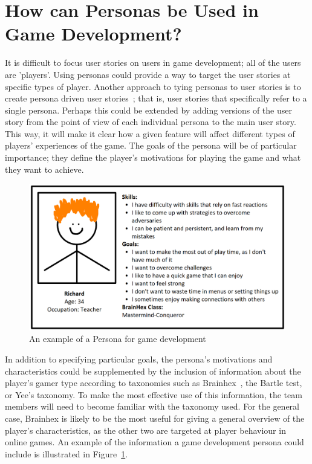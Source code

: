\documentclass{scrartcl}
\begin{document}
\section{How can Personas be Used in Game Development?}
It is difficult to focus user stories on users in game development; all of the users are 'players'. Using personas could provide a way to target the user stories at specific types of player. 
Another approach to tying personas to user stories is to create persona driven user stories~\cite{winter:vision}; that is, user stories that specifically refer to a single persona. Perhaps this could be extended by adding versions of the user story from the point of view of each individual persona to the main user story. This way, it will make it clear how a given feature will affect different types of players' experiences of the game. The goals of the persona will be of particular importance; they define the player's motivations for playing the game and what they want to achieve. 
\begin{figure}[h]
\includegraphics[width=\textwidth]{example.png}
\caption{An example of a Persona for game development}
\label{fig:persona_example}
\end{figure} 
In addition to specifying particular goals, the persona's motivations and characteristics could be supplemented by the inclusion of information about the player's gamer type according to taxonomies such as Brainhex~\cite{nacke:brainhex}, the Bartle test\cite{bartle:mud}, or Yee's taxonomy\cite{yee:online}. To make the most effective use of this information, the team members will need to become familiar with the taxonomy used. For the general case, Brainhex is likely to be the most useful for giving a general overview of the player's characteristics, as the other two are targeted at player behaviour in online games. An example of the information a game development persona could include is illustrated in Figure~\ref{fig:persona_example}. 
\end{document}
